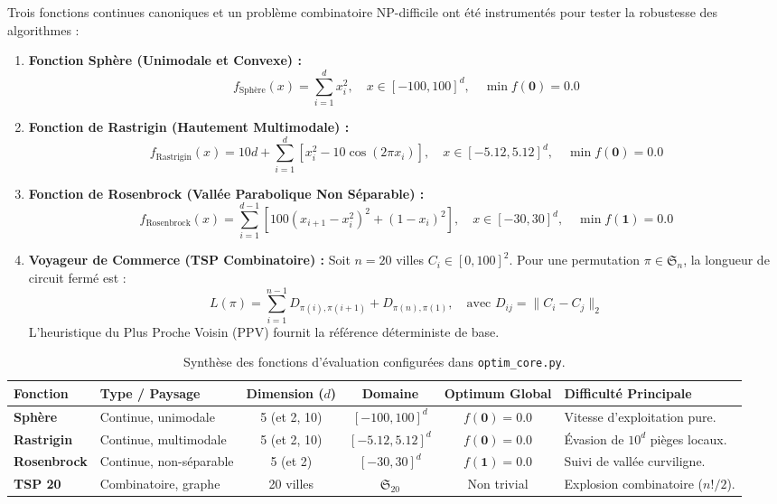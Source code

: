 \documentclass[11pt,a4paper]{article}
\begin{document}
Trois fonctions continues canoniques et un problème combinatoire NP-difficile ont été instrumentés pour tester la robustesse des algorithmes :
\begin{enumerate}\setlength{\itemsep}{0.1em}
    \item \textbf{Fonction Sphère (Unimodale et Convexe) :}
    \begin{equation}
        f_{\text{Sphère}}(x) = \sum_{i=1}^d x_i^2, \quad x \in [-100, 100]^d, \quad \min f(\mathbf{0}) = 0.0
    \end{equation}
    \item \textbf{Fonction de Rastrigin (Hautement Multimodale) :}
    \begin{equation}
        f_{\text{Rastrigin}}(x) = 10d + \sum_{i=1}^d \left[ x_i^2 - 10 \cos(2\pi x_i) \right], \quad x \in [-5.12, 5.12]^d, \quad \min f(\mathbf{0}) = 0.0
    \end{equation}
    \item \textbf{Fonction de Rosenbrock (Vallée Parabolique Non Séparable) :}
    \begin{equation}
        f_{\text{Rosenbrock}}(x) = \sum_{i=1}^{d-1} \left[ 100(x_{i+1} - x_i^2)^2 + (1 - x_i)^2 \right], \quad x \in [-30, 30]^d, \quad \min f(\mathbf{1}) = 0.0
    \end{equation}
    \item \textbf{Voyageur de Commerce (TSP Combinatoire) :}
    Soit $n=20$ villes $C_i \in [0, 100]^2$. Pour une permutation $\pi \in \mathfrak{S}_n$, la longueur de circuit fermé est :
    \begin{equation}
        L(\pi) = \sum_{i=1}^{n-1} D_{\pi(i), \pi(i+1)} + D_{\pi(n), \pi(1)}, \quad \text{avec } D_{ij} = \|C_i - C_j\|_2
    \end{equation}
    L'heuristique du Plus Proche Voisin (PPV) fournit la référence déterministe de base.
\end{enumerate}

\begin{table}[H]
\centering
\small
\begin{tabularx}{\textwidth}{llcccX}
\toprule
\textbf{Fonction} & \textbf{Type / Paysage} & \textbf{Dimension ($d$)} & \textbf{Domaine} & \textbf{Optimum Global} & \textbf{Difficulté Principale} \\
\midrule
\textbf{Sphère} & Continue, unimodale & 5 (et 2, 10) & $[-100, 100]^d$ & $f(\mathbf{0}) = 0.0$ & Vitesse d'exploitation pure. \\
\textbf{Rastrigin} & Continue, multimodale & 5 (et 2, 10) & $[-5.12, 5.12]^d$ & $f(\mathbf{0}) = 0.0$ & Évasion de $10^d$ pièges locaux. \\
\textbf{Rosenbrock} & Continue, non-séparable & 5 (et 2) & $[-30, 30]^d$ & $f(\mathbf{1}) = 0.0$ & Suivi de vallée curviligne. \\
\textbf{TSP 20} & Combinatoire, graphe & 20 villes & $\mathfrak{S}_{20}$ & Non trivial & Explosion combinatoire ($n!/2$). \\
\bottomrule
\end{tabularx}
\caption{Synthèse des fonctions d'évaluation configurées dans \texttt{optim\_core.py}.}
\label{tab:benchmarks}
\end{table}
\end{document}
